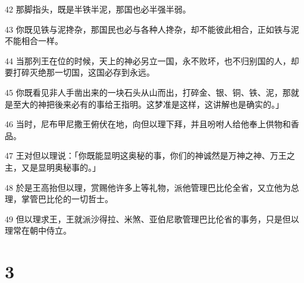 \par 42 那脚指头，既是半铁半泥，那国也必半强半弱。
\par 43 你既见铁与泥搀杂，那国民也必与各种人搀杂，却不能彼此相合，正如铁与泥不能相合一样。
\par 44 当那列王在位的时候，天上的神必另立一国，永不败坏，也不归别国的人，却要打碎灭绝那一切国，这国必存到永远。
\par 45 你既看见非人手凿出来的一块石头从山而出，打碎金、银、铜、铁、泥，那就是至大的神把後来必有的事给王指明。这梦准是这样，这讲解也是确实的。」
\par 46 当时，尼布甲尼撒王俯伏在地，向但以理下拜，并且吩咐人给他奉上供物和香品。
\par 47 王对但以理说：「你既能显明这奥秘的事，你们的神诚然是万神之神、万王之主，又是显明奥秘事的。」
\par 48 於是王高抬但以理，赏赐他许多上等礼物，派他管理巴比伦全省，又立他为总理，掌管巴比伦的一切哲士。
\par 49 但以理求王，王就派沙得拉、米煞、亚伯尼歌管理巴比伦省的事务，只是但以理常在朝中侍立。

\chapter{3}


